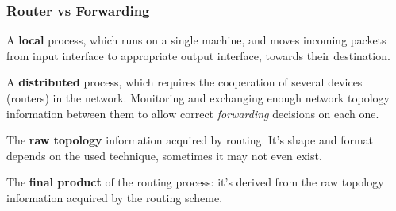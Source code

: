\subsubsection{Router vs Forwarding}
\begin{definition}[Forwarding]
	A \textbf{local} process, which runs on a single machine, and moves incoming packets from input interface to appropriate output interface, towards their destination.
\end{definition}

\begin{definition}[Routing]
	A \textbf{distributed} process, which requires the cooperation of several devices (routers) in the network. Monitoring and exchanging enough network topology information between them to allow correct \textit{forwarding} decisions on each one.
\end{definition}

\begin{definition}
	The \textbf{raw topology} information acquired by routing. It's shape and format depends on the used technique, sometimes it may not even exist.
\end{definition}

\begin{definition}
	The \textbf{final product} of the routing process: it's derived from the raw topology information acquired by the routing scheme.
\end{definition}

